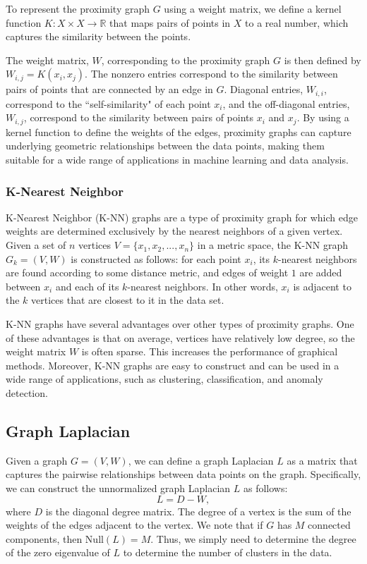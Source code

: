\documentclass[12pt]{amsart}
\begin{document}
To represent the proximity graph $G$ using a weight matrix, we define a kernel function $K\colon X \times X \rightarrow \mathbb{R}$ that maps pairs of points in $X$ to a real number, which captures the similarity between the points. 

The weight matrix, $W$, corresponding to the proximity graph $G$ is then defined by $W_{i,j} = K(x_i,x_j)$. The nonzero entries correspond to the similarity between pairs of points that are connected by an edge in $G$. Diagonal entries, $W_{i,i}$, correspond to the ``self-similarity" of each point $x_i$, and the off-diagonal entries, $W_{i,j}$, correspond to the similarity between pairs of points $x_i$ and $x_j$. By using a kernel function to define the weights of the edges, proximity graphs can capture underlying geometric relationships between the data points, making them suitable for a wide range of applications in machine learning and data analysis.
\subsubsection{K-Nearest Neighbor}
K-Nearest Neighbor (K-NN) graphs are a type of proximity graph for which edge weights are determined exclusively by the nearest neighbors of a given vertex. Given a set of $n$ vertices $V = \{x_1, x_2, ..., x_n\}$ in a metric space, the K-NN graph $G_k = (V, W)$ is constructed as follows: for each point $x_i$, its $k$-nearest neighbors are found according to some distance metric, and edges of weight $1$ are added between $x_i$ and each of its $k$-nearest neighbors. In other words, $x_i$ is adjacent to the $k$ vertices that are closest to it in the data set.

K-NN graphs have several advantages over other types of proximity graphs. One of these advantages is that on average, vertices have relatively low degree, so the weight matrix $W$ is often sparse. This increases the performance of graphical methods. Moreover, K-NN graphs are easy to construct and can be used in a wide range of applications, such as clustering, classification, and anomaly detection.

\subsection{Graph Laplacian}
Given a graph $G = (V, W)$, we can define a graph Laplacian $L$ as a matrix that captures the pairwise relationships between data points on the graph. Specifically, we can construct the unnormalized graph Laplacian $L$ as follows:
$$ L = D - W, $$
where $D$ is the diagonal degree matrix. The degree of a vertex is the sum of the weights of the edges adjacent to the vertex. We note that if $G$ has $M$ connected components, then $\mathrm{Null}(L)=M$. Thus, we simply need to determine the degree of the zero eigenvalue of $L$ to determine the number of clusters in the data.
\end{document}
